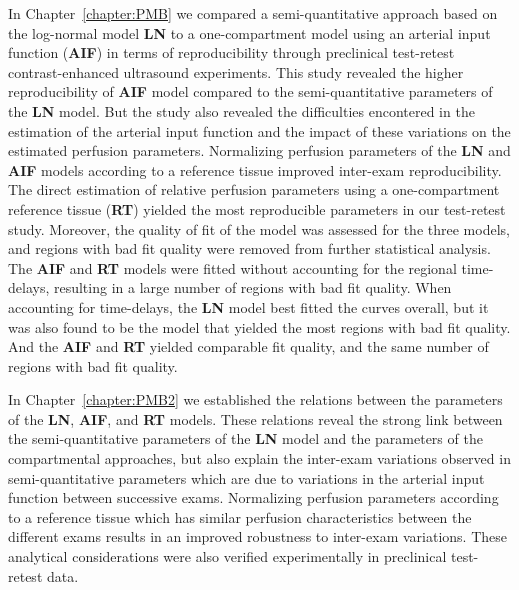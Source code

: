 In Chapter~\ref{chapter:PMB} we compared a semi-quantitative approach based on the log-normal model \textbf{LN} to a one-compartment model using an arterial input function (\textbf{AIF}) in terms of reproducibility through preclinical test-retest contrast-enhanced ultrasound experiments.
This study revealed the higher reproducibility of \textbf{AIF} model compared to the semi-quantitative parameters of the \textbf{LN} model.
But the study also revealed the difficulties encontered in the estimation of the arterial input function and the impact of these variations on the estimated perfusion parameters.
Normalizing perfusion parameters of the \textbf{LN} and \textbf{AIF} models according to a reference tissue improved inter-exam reproducibility.
The direct estimation of relative perfusion parameters using a one-compartment reference tissue (\textbf{RT}) yielded the most reproducible parameters in our test-retest study.
Moreover, the quality of fit of the model was assessed for the three models, and regions with bad fit quality were removed from further statistical analysis.
The \textbf{AIF} and \textbf{RT} models were fitted without accounting for the regional time-delays, resulting in a large number of regions with bad fit quality.
When accounting for time-delays, the \textbf{LN} model best fitted the curves overall, but it was also found to be the model that yielded the most regions with bad fit quality.
And the \textbf{AIF} and \textbf{RT} yielded comparable fit quality, and the same number of regions with bad fit quality.

In Chapter~\ref{chapter:PMB2} we established the relations between the parameters of the \textbf{LN}, \textbf{AIF}, and \textbf{RT} models.
These relations reveal the strong link between the semi-quantitative parameters of the \textbf{LN} model and the parameters of the compartmental approaches, but also explain the inter-exam variations observed in semi-quantitative parameters which are due to variations in the arterial input function between successive exams.
Normalizing perfusion parameters according to a reference tissue which has similar perfusion characteristics between the different exams results in an improved robustness to inter-exam variations.
These analytical considerations were also verified experimentally in preclinical test-retest data.

